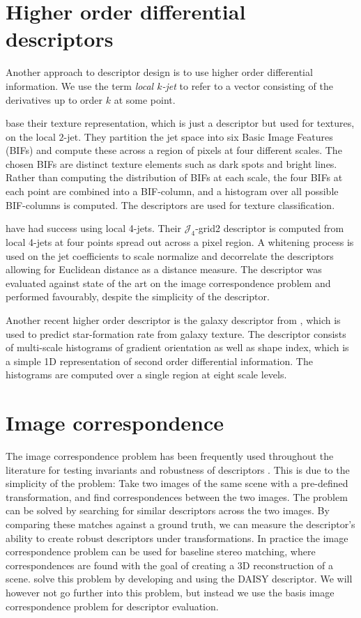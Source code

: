 \documentclass[thesis.tex]{subfiles}
\begin{document}
\section{Higher order differential descriptors}

Another approach to descriptor design is to use higher order differential information. We use the term \emph{local $k$-jet} to refer to a vector consisting of the derivatives up to order $k$ at some point.

\citet{crosier2010using} base their texture representation, which is just a descriptor but used for textures, on the local $2$-jet. They partition the jet space into six Basic Image Features (BIFs) and compute these across a region of pixels at four different scales. The chosen BIFs are distinct texture elements such as dark spots and bright lines. Rather than computing the distribution of BIFs at each scale, the four BIFs at each point are combined into a BIF-column, and a histogram over all possible BIF-columns is computed. The descriptors are used for texture classification.

\citet{larsen2012jet} have had success using local 4-jets. Their $\mathcal{J}_4$-grid2 descriptor is computed from local 4-jets at four points spread out across a pixel region. A whitening process is used on the jet coefficients to scale normalize and decorrelate the descriptors allowing for Euclidean distance as a distance measure. The descriptor was evaluated against state of the art on the image correspondence problem and performed favourably, despite the simplicity of the descriptor.

Another recent higher order descriptor is the galaxy descriptor from \citet{pedersen2013shape}, which is used to predict star-formation rate from galaxy texture. The descriptor consists of multi-scale histograms of gradient orientation as well as shape index, which is a simple 1D representation of second order differential information. The histograms are computed over a single region at eight scale levels.
%
\section{Image correspondence}
%
The image correspondence problem has been frequently used throughout the literature for testing invariants and robustness of descriptors \cite{lowe2004distinctive,mikolajczyk2005performance,ke2004pca,larsen2012jet,cui2009scale,toews2009sift}. This is due to the simplicity of the problem: Take two images of the same scene with a pre-defined transformation, and find correspondences between the two images. The problem can be solved by searching for similar descriptors across the two images. By comparing these matches against a ground truth, we can measure the descriptor's ability to create robust descriptors under transformations. In practice the image correspondence problem can be used for baseline stereo matching, where correspondences are found with the goal of creating a 3D reconstruction of a scene. \citet{tola2008fast} solve this problem by developing and using the DAISY descriptor. We will however not go further into this problem, but instead we use the basis image correspondence problem for descriptor evaluation.
\end{document}
